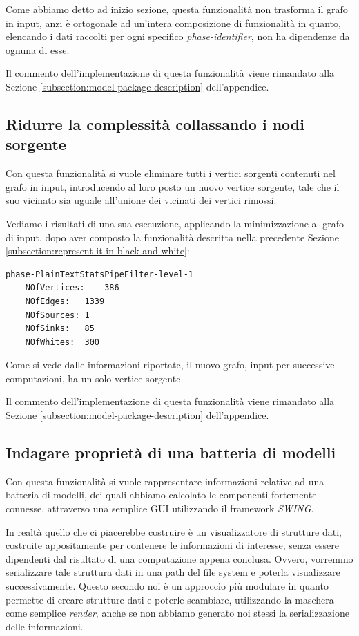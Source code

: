 Come abbiamo detto ad inizio sezione, questa funzionalit\`a non
trasforma il grafo in input, anzi \`e ortogonale ad un'intera
composizione di funzionalit\`a in quanto, elencando i dati raccolti
per ogni specifico \emph{phase-identifier}, non ha dipendenze da
ognuna di esse.

Il commento dell'implementazione di questa funzionalit\`a viene
rimandato alla Sezione \ref{subsection:model-package-description}
dell'appendice.

\subsection{Ridurre la complessit\`a collassando i nodi sorgente}
Con questa funzionalit\`a si vuole eliminare tutti i vertici sorgenti
contenuti nel grafo in input, introducendo al loro posto un nuovo
vertice sorgente, tale che il suo vicinato sia uguale all'unione dei
vicinati dei vertici rimossi.

Vediamo i risultati di una sua esecuzione, applicando la
minimizzazione al grafo di input, dopo aver composto la funzionalit\`a
descritta nella precedente Sezione
\ref{subsection:represent-it-in-black-and-white}:
\begin{lstlisting}
phase-PlainTextStatsPipeFilter-level-1
	NOfVertices:	386
	NOfEdges:	1339
	NOfSources:	1
	NOfSinks:	85
	NOfWhites:	300
\end{lstlisting}
Come si vede dalle informazioni riportate, il nuovo grafo, input per
successive computazioni, ha un solo vertice sorgente.

Il commento dell'implementazione di questa funzionalit\`a viene
rimandato alla Sezione \ref{subsection:model-package-description}
dell'appendice.


\subsection{Indagare propriet\`a di una batteria di modelli}
\label{subsection:use-case-result-viewer}
Con questa funzionalit\`a si vuole rappresentare informazioni relative
ad una batteria di modelli, dei quali abbiamo calcolato le componenti
fortemente connesse, attraverso una semplice GUI utilizzando il
framework \emph{SWING}.

In realt\`a quello che ci piacerebbe costruire \`e un visualizzatore
di strutture dati, costruite appositamente per contenere le
informazioni di interesse, senza essere dipendenti dal risultato di
una computazione appena conclusa. Ovvero, vorremmo serializzare tale
struttura dati in una path del file system e poterla visualizzare
successivamente. Questo secondo noi \`e un approccio pi\`u modulare in
quanto permette di creare strutture dati e poterle scambiare,
utilizzando la maschera come semplice \emph{render}, anche se non
abbiamo generato noi stessi la serializzazione delle informazioni.

